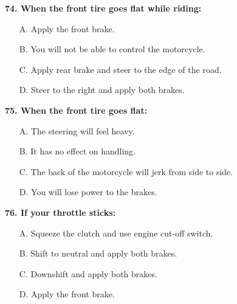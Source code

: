 \begin{minipage}{\linewidth}
\vspace{1em}\noindent\textbf{74. When the front tire goes flat while riding:}

\begin{itemize}[nosep,leftmargin=2em]
\item [A.] Apply the front brake.
\item [B.] You will not be able to control the motorcycle.
\item [C.] Apply rear brake and steer to the edge of the road.
\item [D.] Steer to the right and apply both brakes.

\end{itemize}
\end{minipage}


\begin{minipage}{\linewidth}
\vspace{1em}\noindent\textbf{75. When the front tire goes flat:}

\begin{itemize}[nosep,leftmargin=2em]
\item [A.] The steering will feel heavy.
\item [B.] It has no effect on handling.
\item [C.] The back of the motorcycle will jerk from side to side.
\item [D.] You will lose power to the brakes.

\end{itemize}
\end{minipage}


\begin{minipage}{\linewidth}
\vspace{1em}\noindent\textbf{76. If your throttle sticks:}

\begin{itemize}[nosep,leftmargin=2em]
\item [A.] Squeeze the clutch and use engine cut-off switch.
\item [B.] Shift to neutral and apply both brakes.
\item [C.] Downshift and apply both brakes.
\item [D.] Apply the front brake.

\end{itemize}
\end{minipage}


